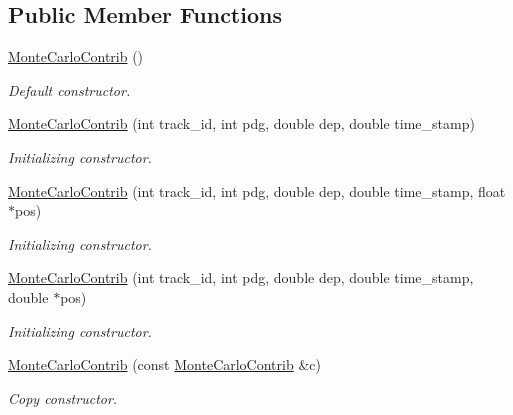 \subsection*{Public Member Functions}
\begin{DoxyCompactItemize}
\item 
\hyperlink{class_d_d4hep_1_1_simulation_1_1_geant4_hit_data_1_1_monte_carlo_contrib_a1c645716d88f4e36bd62b9ad374808ee}{Monte\+Carlo\+Contrib} ()
\begin{DoxyCompactList}\small\item\em Default constructor. \end{DoxyCompactList}\item 
\hyperlink{class_d_d4hep_1_1_simulation_1_1_geant4_hit_data_1_1_monte_carlo_contrib_a1ae337705c3b25f0ba9521d4be0b009c}{Monte\+Carlo\+Contrib} (int track\+\_\+id, int pdg, double dep, double time\+\_\+stamp)
\begin{DoxyCompactList}\small\item\em Initializing constructor. \end{DoxyCompactList}\item 
\hyperlink{class_d_d4hep_1_1_simulation_1_1_geant4_hit_data_1_1_monte_carlo_contrib_a52279e49adb2ef0be6fde7fdbf43d57f}{Monte\+Carlo\+Contrib} (int track\+\_\+id, int pdg, double dep, double time\+\_\+stamp, float $\ast$pos)
\begin{DoxyCompactList}\small\item\em Initializing constructor. \end{DoxyCompactList}\item 
\hyperlink{class_d_d4hep_1_1_simulation_1_1_geant4_hit_data_1_1_monte_carlo_contrib_ac8d6f1ef4bbb713c2f7a1ee10230450e}{Monte\+Carlo\+Contrib} (int track\+\_\+id, int pdg, double dep, double time\+\_\+stamp, double $\ast$pos)
\begin{DoxyCompactList}\small\item\em Initializing constructor. \end{DoxyCompactList}\item 
\hyperlink{class_d_d4hep_1_1_simulation_1_1_geant4_hit_data_1_1_monte_carlo_contrib_a71e9bcc92b1997f224426aa7418f452c}{Monte\+Carlo\+Contrib} (const \hyperlink{class_d_d4hep_1_1_simulation_1_1_geant4_hit_data_1_1_monte_carlo_contrib}{Monte\+Carlo\+Contrib} \&c)
\begin{DoxyCompactList}\small\item\em Copy constructor. \end{DoxyCompactList}\item 

\end{DoxyCompactItemize}
